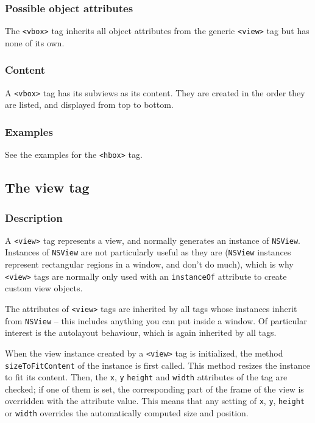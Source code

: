 \subsubsection{Possible object attributes}
The \texttt{<vbox>} tag inherits all object attributes from the
generic \texttt{<view>} tag but has none of its own.

\subsubsection{Content}
A \texttt{<vbox>} tag has its subviews as its content.  They are
created in the order they are listed, and displayed from top to
bottom.

\subsubsection{Examples}
See the examples for the \texttt{<hbox>} tag.

\subsection{The view tag}

\subsubsection{Description}
A \texttt{<view>} tag represents a view, and normally generates an
instance of \texttt{NSView}.  Instances of \texttt{NSView} are not
particularly useful as they are (\texttt{NSView} instances represent
rectangular regions in a window, and don't do much), which is why
\texttt{<view>} tags are normally only used with an \texttt{instanceOf}
 attribute to create custom view objects.

The attributes of \texttt{<view>} tags are inherited by all tags whose
instances inherit from \texttt{NSView} -- this includes anything you
can put inside a window.  Of particular interest is the autolayout
behaviour, which is again inherited by all tags.

When the view instance created by a \texttt{<view>} tag is
initialized, the method \texttt{sizeToFitContent} of the instance is
first called.  This method resizes the instance to fit its content.
Then, the \texttt{x}, \texttt{y} \texttt{height} and \texttt{width}
attributes of the tag are checked; if one of them is set, the
corresponding part of the frame of the view is overridden with the
attribute value.  This means that any setting of \texttt{x},
\texttt{y}, \texttt{height} or \texttt{width} overrides the
automatically computed size and position.


